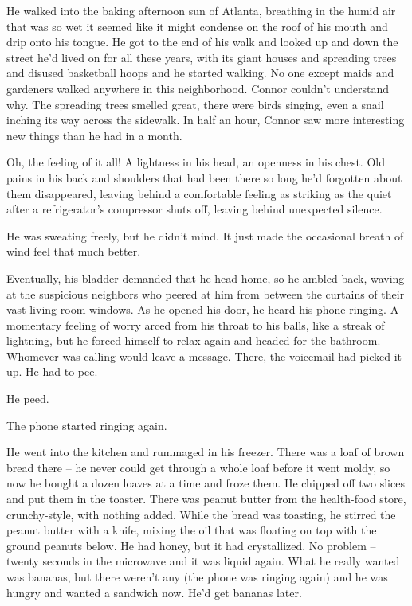 He walked into the baking afternoon sun of Atlanta, breathing in
the humid air that was so wet it seemed like it might condense on
the roof of his mouth and drip onto his tongue. He got to the end
of his walk and looked up and down the street he'd lived on for all
these years, with its giant houses and spreading trees and disused
basketball hoops and he started walking. No one except maids and
gardeners walked anywhere in this neighborhood. Connor couldn't
understand why. The spreading trees smelled great, there were birds
singing, even a snail inching its way across the sidewalk. In half
an hour, Connor saw more interesting new things than he had in a
month.

Oh, the feeling of it all! A lightness in his head, an openness in
his chest. Old pains in his back and shoulders that had been there
so long he'd forgotten about them disappeared, leaving behind a
comfortable feeling as striking as the quiet after a refrigerator's
compressor shuts off, leaving behind unexpected silence.

He was sweating freely, but he didn't mind. It just made the
occasional breath of wind feel that much better.

Eventually, his bladder demanded that he head home, so he ambled
back, waving at the suspicious neighbors who peered at him from
between the curtains of their vast living-room windows. As he
opened his door, he heard his phone ringing. A momentary feeling of
worry arced from his throat to his balls, like a streak of
lightning, but he forced himself to relax again and headed for the
bathroom. Whomever was calling would leave a message. There, the
voicemail had picked it up. He had to pee.

He peed.

The phone started ringing again.

He went into the kitchen and rummaged in his freezer. There was a
loaf of brown bread there -- he never could get through a whole
loaf before it went moldy, so now he bought a dozen loaves at a
time and froze them. He chipped off two slices and put them in the
toaster. There was peanut butter from the health-food store,
crunchy-style, with nothing added. While the bread was toasting, he
stirred the peanut butter with a knife, mixing the oil that was
floating on top with the ground peanuts below. He had honey, but it
had crystallized. No problem -- twenty seconds in the microwave and
it was liquid again. What he really wanted was bananas, but there
weren't any (the phone was ringing again) and he was hungry and
wanted a sandwich now. He'd get bananas later.

